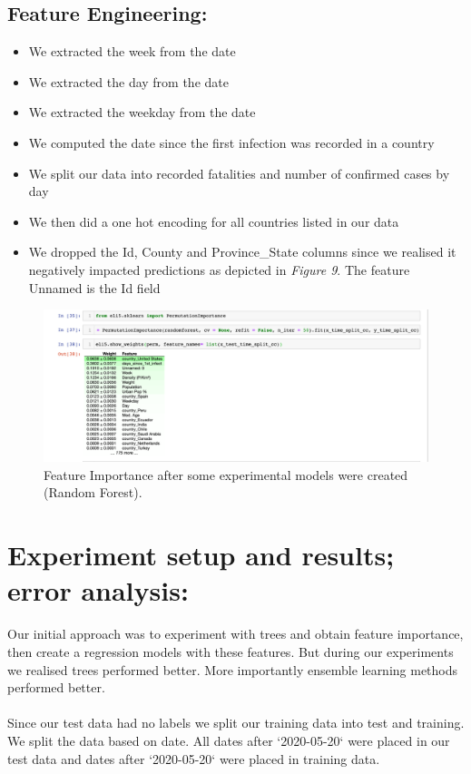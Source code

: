 \documentclass{article}
\begin{document}
\subsection{Feature Engineering:}
\begin{itemize}
\item We extracted the week from the date
\item We extracted the day from the date
\item We extracted the weekday from the date
\item We computed the date since the first infection was recorded in a country
\item We split our data into recorded fatalities and number of confirmed cases by day
\item We then did a one hot encoding for all countries listed in our data
\item We dropped the Id, County and Province\_State columns since we realised it negatively impacted predictions as depicted in \emph{Figure 9}. The feature Unnamed is the Id field
\end{itemize}

\begin{figure}
  \centering
  \includegraphics[width=\columnwidth]{feature_importance.png}
  \caption{Feature Importance after some experimental models were created (Random Forest).}
\end{figure}

\section{Experiment setup and results; error analysis:}
Our initial approach was to experiment with trees and obtain feature importance, then create a regression models with these features. But during our experiments we realised trees performed better. More importantly ensemble learning methods performed better.
\\
\\
Since our test data had no labels we split our training data into test and training. We split the data based on date. All dates after `2020-05-20` were placed in our test data and dates after  `2020-05-20` were placed in training data.
\end{document}
